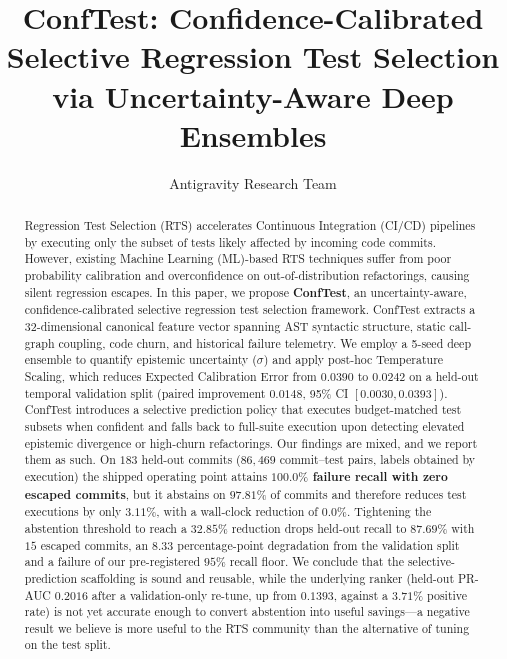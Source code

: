 \documentclass[sigconf,screen]{acmart}
\begin{document}
\title{ConfTest: Confidence-Calibrated Selective Regression Test Selection via Uncertainty-Aware Deep Ensembles}

\author{Antigravity Research Team}

\begin{abstract}
Regression Test Selection (RTS) accelerates Continuous Integration (CI/CD) pipelines by executing only the subset of tests likely affected by incoming code commits. However, existing Machine Learning (ML)-based RTS techniques suffer from poor probability calibration and overconfidence on out-of-distribution refactorings, causing silent regression escapes. In this paper, we propose \textbf{ConfTest}, an uncertainty-aware, confidence-calibrated selective regression test selection framework. ConfTest extracts a 32-dimensional canonical feature vector spanning AST syntactic structure, static call-graph coupling, code churn, and historical failure telemetry. We employ a 5-seed deep ensemble to quantify epistemic uncertainty ($\sigma$) and apply post-hoc Temperature Scaling, which reduces Expected Calibration Error from $0.0390$ to $0.0242$ on a held-out temporal validation split (paired improvement $0.0148$, 95\% CI $[0.0030, 0.0393]$). ConfTest introduces a selective prediction policy that executes budget-matched test subsets when confident and falls back to full-suite execution upon detecting elevated epistemic divergence or high-churn refactorings. Our findings are mixed, and we report them as such. On $183$ held-out commits ($86{,}469$ commit--test pairs, labels obtained by execution) the shipped operating point attains \textbf{$100.0\%$ failure recall with zero escaped commits}, but it abstains on $97.81\%$ of commits and therefore reduces test executions by only $3.11\%$, with a wall-clock reduction of $0.0\%$. Tightening the abstention threshold to reach a $32.85\%$ reduction drops held-out recall to $87.69\%$ with $15$ escaped commits, an $8.33$ percentage-point degradation from the validation split and a failure of our pre-registered $95\%$ recall floor. We conclude that the selective-prediction scaffolding is sound and reusable, while the underlying ranker (held-out PR-AUC $0.2016$ after a validation-only re-tune, up from $0.1393$, against a $3.71\%$ positive rate) is not yet accurate enough to convert abstention into useful savings---a negative result we believe is more useful to the RTS community than the alternative of tuning on the test split.
\end{abstract}
\end{document}
